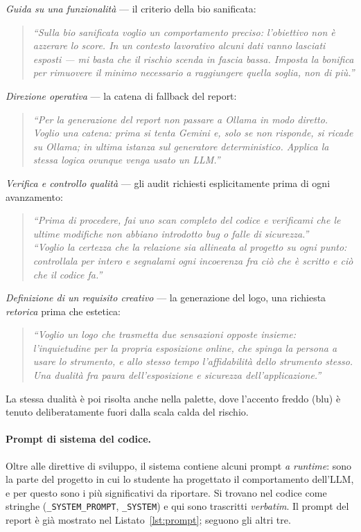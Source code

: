 \documentclass[11pt,a4paper]{article}
\begin{document}
\emph{Guida su una funzionalità} --- il criterio della bio sanificata:
\begin{quote}\small\itshape
``Sulla bio sanificata voglio un comportamento preciso: l'obiettivo non è azzerare lo
score. In un contesto lavorativo alcuni dati vanno lasciati esposti --- mi basta che il
rischio scenda in fascia bassa. Imposta la bonifica per rimuovere il minimo necessario a
raggiungere quella soglia, non di più.''
\end{quote}

\emph{Direzione operativa} --- la catena di fallback del report:
\begin{quote}\small\itshape
``Per la generazione del report non passare a Ollama in modo diretto. Voglio una catena:
prima si tenta Gemini e, solo se non risponde, si ricade su Ollama; in ultima istanza sul
generatore deterministico. Applica la stessa logica ovunque venga usato un LLM.''
\end{quote}

\emph{Verifica e controllo qualità} --- gli audit richiesti esplicitamente prima di ogni
avanzamento:
\begin{quote}\small\itshape
``Prima di procedere, fai uno scan completo del codice e verificami che le ultime modifiche
non abbiano introdotto bug o falle di sicurezza.''\\
``Voglio la certezza che la relazione sia allineata al progetto su ogni punto: controllala
per intero e segnalami ogni incoerenza fra ciò che è scritto e ciò che il codice fa.''
\end{quote}

\emph{Definizione di un requisito creativo} --- la generazione del logo, una richiesta
\emph{retorica} prima che estetica:
\begin{quote}\small\itshape
``Voglio un logo che trasmetta due sensazioni opposte insieme: l'inquietudine per la
propria esposizione online, che spinga la persona a usare lo strumento, e allo stesso tempo
l'affidabilità dello strumento stesso. Una dualità fra paura dell'esposizione e sicurezza
dell'applicazione.''
\end{quote}
La stessa dualità è poi risolta anche nella palette, dove l'accento freddo (blu) è tenuto
deliberatamente fuori dalla scala calda del rischio.

\paragraph{Prompt di sistema del codice.} Oltre alle direttive di sviluppo, il sistema
contiene alcuni prompt \emph{a runtime}: sono la parte del progetto in cui lo studente ha
progettato il comportamento dell'LLM, e per questo sono i più significativi da riportare.
Si trovano nel codice come stringhe (\texttt{\_SYSTEM\_PROMPT}, \texttt{\_SYSTEM}) e qui
sono trascritti \emph{verbatim}. Il prompt del report è già mostrato nel
Listato~\ref{lst:prompt}; seguono gli altri tre.
\end{document}
